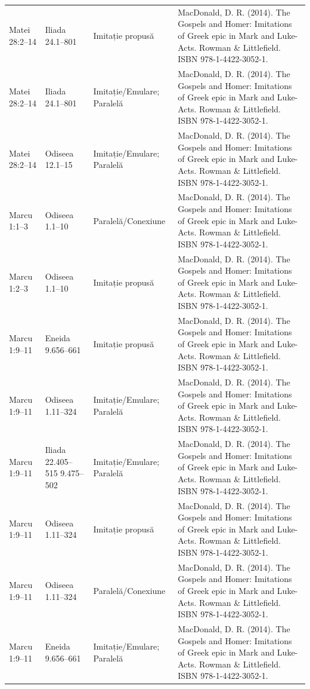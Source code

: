 \documentclass[12pt,a4paper,twoside,openany]{book}
\begin{document}
\begin{longtable}{L{1.4cm}L{1.7cm}L{3.1cm}L{8.4cm}}
Matei 28:2–14 & Iliada 24.1–801 & Imitație propusă & MacDonald, D. R. (2014). The Gospels and Homer: Imitations of Greek epic in Mark and Luke-Acts. Rowman \& Littlefield. ISBN 978-1-4422-3052-1. \\
Matei 28:2–14 & Iliada 24.1–801 & Imitație/Emulare; Paralelă & MacDonald, D. R. (2014). The Gospels and Homer: Imitations of Greek epic in Mark and Luke-Acts. Rowman \& Littlefield. ISBN 978-1-4422-3052-1. \\
Matei 28:2–14 & Odiseea 12.1–15 & Imitație/Emulare; Paralelă & MacDonald, D. R. (2014). The Gospels and Homer: Imitations of Greek epic in Mark and Luke-Acts. Rowman \& Littlefield. ISBN 978-1-4422-3052-1. \\
Marcu 1:1–3 & Odiseea 1.1–10 & Paralelă/Conexiune & MacDonald, D. R. (2014). The Gospels and Homer: Imitations of Greek epic in Mark and Luke-Acts. Rowman \& Littlefield. ISBN 978-1-4422-3052-1. \\
Marcu 1:2–3 & Odiseea 1.1–10 & Imitație propusă & MacDonald, D. R. (2014). The Gospels and Homer: Imitations of Greek epic in Mark and Luke-Acts. Rowman \& Littlefield. ISBN 978-1-4422-3052-1. \\
Marcu 1:9–11 & Eneida 9.656–661 & Imitație propusă & MacDonald, D. R. (2014). The Gospels and Homer: Imitations of Greek epic in Mark and Luke-Acts. Rowman \& Littlefield. ISBN 978-1-4422-3052-1. \\
Marcu 1:9–11 & Odiseea 1.11–324 & Imitație/Emulare; Paralelă & MacDonald, D. R. (2014). The Gospels and Homer: Imitations of Greek epic in Mark and Luke-Acts. Rowman \& Littlefield. ISBN 978-1-4422-3052-1. \\
Marcu 1:9–11 & Iliada 22.405–515 9.475–502 & Imitație/Emulare; Paralelă & MacDonald, D. R. (2014). The Gospels and Homer: Imitations of Greek epic in Mark and Luke-Acts. Rowman \& Littlefield. ISBN 978-1-4422-3052-1. \\
Marcu 1:9–11 & Odiseea 1.11–324 & Imitație propusă & MacDonald, D. R. (2014). The Gospels and Homer: Imitations of Greek epic in Mark and Luke-Acts. Rowman \& Littlefield. ISBN 978-1-4422-3052-1. \\
Marcu 1:9–11 & Odiseea 1.11–324 & Paralelă/Conexiune & MacDonald, D. R. (2014). The Gospels and Homer: Imitations of Greek epic in Mark and Luke-Acts. Rowman \& Littlefield. ISBN 978-1-4422-3052-1. \\
Marcu 1:9–11 & Eneida 9.656–661 & Imitație/Emulare; Paralelă & MacDonald, D. R. (2014). The Gospels and Homer: Imitations of Greek epic in Mark and Luke-Acts. Rowman \& Littlefield. ISBN 978-1-4422-3052-1. \\

\end{longtable}
\end{document}
